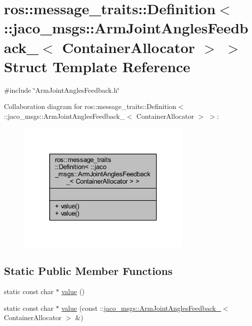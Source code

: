 \hypertarget{structros_1_1message__traits_1_1Definition_3_01_1_1jaco__msgs_1_1ArmJointAnglesFeedback___3_01ContainerAllocator_01_4_01_4}{}\section{ros\+:\+:message\+\_\+traits\+:\+:Definition$<$ \+:\+:jaco\+\_\+msgs\+:\+:Arm\+Joint\+Angles\+Feedback\+\_\+$<$ Container\+Allocator $>$ $>$ Struct Template Reference}
\label{structros_1_1message__traits_1_1Definition_3_01_1_1jaco__msgs_1_1ArmJointAnglesFeedback___3_01ContainerAllocator_01_4_01_4}


{\ttfamily \#include \char`\"{}Arm\+Joint\+Angles\+Feedback.\+h\char`\"{}}



Collaboration diagram for ros\+:\+:message\+\_\+traits\+:\+:Definition$<$ \+:\+:jaco\+\_\+msgs\+:\+:Arm\+Joint\+Angles\+Feedback\+\_\+$<$ Container\+Allocator $>$ $>$\+:
\nopagebreak
\begin{figure}[H]
\begin{center}
\leavevmode
\includegraphics[width=243pt]{db/d14/structros_1_1message__traits_1_1Definition_3_01_1_1jaco__msgs_1_1ArmJointAnglesFeedback___3_01Co63e4c2c03c3317f445b03558fd53cbd4}
\end{center}
\end{figure}
\subsection*{Static Public Member Functions}
\begin{DoxyCompactItemize}
\item 
static const char $\ast$ \hyperlink{structros_1_1message__traits_1_1Definition_3_01_1_1jaco__msgs_1_1ArmJointAnglesFeedback___3_01ContainerAllocator_01_4_01_4_ac16eec284f4f7335505c277b9ed5f5c0}{value} ()
\item 
static const char $\ast$ \hyperlink{structros_1_1message__traits_1_1Definition_3_01_1_1jaco__msgs_1_1ArmJointAnglesFeedback___3_01ContainerAllocator_01_4_01_4_aaac4698420c5eb98daca1e7df0f14fe0}{value} (const \+::\hyperlink{structjaco__msgs_1_1ArmJointAnglesFeedback__}{jaco\+\_\+msgs\+::\+Arm\+Joint\+Angles\+Feedback\+\_\+}$<$ Container\+Allocator $>$ \&)
\end{DoxyCompactItemize}



